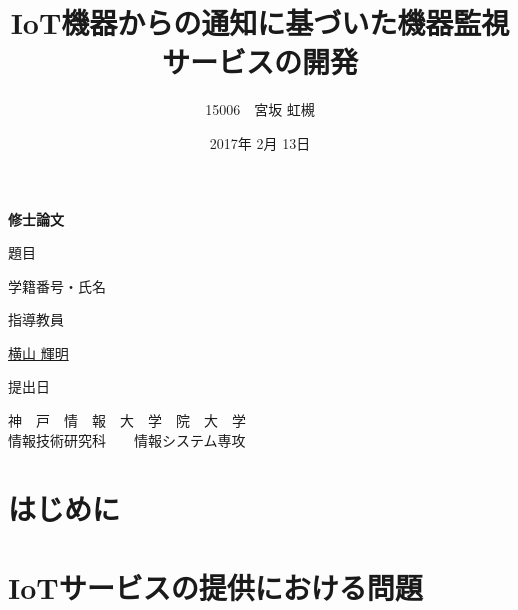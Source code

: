 \documentclass[a4paper]{jreport}
\begin{document}
\makeatletter
\renewcommand{\bibname}{参考文献}

\title{IoT機器からの通知に基づいた機器監視サービスの開発}
\author{15006　宮坂 虹槻}
\date{2017年 2月 13日}
\def\@teacher{横山 輝明}

\begin{titlepage}\begin{center}
{\Huge \textbf{修士論文} \par}
\vspace{1.5cm}
{\LARGE\gt 題目 \par}
{\LARGE\gt \underline{\@title} \par}
\vspace{2.5cm}
{\LARGE\gt 学籍番号・氏名 \par}
\vspace{1.5cm}
{\LARGE \underline{\@author} \par}
\vspace{1.5cm}
{\LARGE\gt 指導教員 \par}
\vspace{1.5cm}
{\LARGE\gt \underline{\@teacher} \par}
\vspace{1.5cm}
{\LARGE\gt 提出日 \par}
\vspace{1.5cm}
{\LARGE\gt \underline{\@date} \par}
\vspace{1.5cm}
{\Large\gt
神　戸　情　報　大　学　院　大　学\\
情報技術研究科　　情報システム専攻\\
\par}
\end{center}\end{titlepage}
\restoregeometry
\makeatother

\tableofcontents
\listoffigures
\listoftables

\begin{abstract}

\end{abstract}

\chapter{はじめに}

\chapter{IoTサービスの提供における問題}

%
\end{document}
